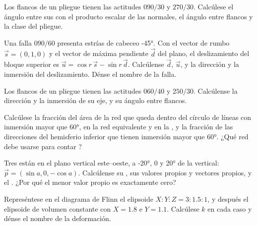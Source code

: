 \begin{exercise}[$\star$]\label{exo:b3:structural-analysis:3}
Los flancos de un pliegue tienen las actitudes $090/30$ y $270/30$. Calcúlese el
ángulo entre sus  con el producto escalar de las normales, el ángulo entre flancos y
la clase del pliegue.
\end{exercise}

\begin{exercise}[$\star$]\label{exo:b3:structural-analysis:4}
Una falla $090/60$ presenta estrías de cabeceo \ang{-45}. Con el vector de rumbo
$\vec s = (0, 1, 0)$ y el vector de máxima pendiente $\vec d$ del plano, el deslizamiento
del bloque superior es $\vec u = \cos r\,\vec s - \sin r\,\vec d$. Calcúlense
$\vec d$, $\vec u$, y la dirección y la inmersión del deslizamiento. Dénse el nombre de la falla.
\end{exercise}

\begin{exercise}[$\star\star$]\label{exo:b3:structural-analysis:5}
Los flancos de un pliegue tienen las actitudes $060/40$ y $250/30$. Calcúlense la
dirección y la inmersión de su eje, y su ángulo entre flancos.
\end{exercise}

\begin{exercise}[$\star\star$]\label{exo:b3:structural-analysis:6}
Calcúlese la fracción del área de la red que queda dentro del círculo de
líneas con inmersión mayor que \ang{60}, en la red equivalente y en la ,
y la fracción de las direcciones del hemisferio inferior que tienen inmersión mayor
que \ang{60}. ¿Qué red debe usarse para contar ?
\end{exercise}

\begin{exercise}[$\star\star$]\label{exo:b3:structural-analysis:7}
Tres  están en el plano vertical este--oeste, a \ang{-20}, $0$ y
\ang{20} de la vertical: $\vec p = (\sin a, 0, -\cos a)$. Calcúlense su ,
sus valores propios y vectores propios, y el . ¿Por qué
el menor valor propio es exactamente cero?
\end{exercise}

\begin{exercise}[$\star\star$]\label{exo:b3:structural-analysis:8}
Represéntese en el diagrama de Flinn el elipsoide $X : Y : Z = 3 : 1.5 : 1$, y después el
elipsoide de volumen constante con $X = 1.8$ e $Y = 1.1$. Calcúlese $k$ en
cada caso y dénse el nombre de la deformación.
\end{exercise}

